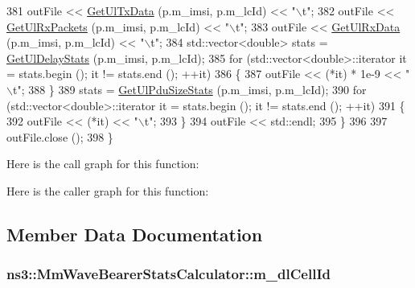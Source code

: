 \begin{DoxyCode}
381       outFile << \hyperlink{classns3_1_1MmWaveBearerStatsCalculator_ab78a9bb574055dfb4fab4218baebc792}{GetUlTxData} (p.m\_imsi, p.m\_lcId) << \textcolor{stringliteral}{"\(\backslash\)t"};
382       outFile << \hyperlink{classns3_1_1MmWaveBearerStatsCalculator_ac892abcdd54ff9f84c722aaf6524fc38}{GetUlRxPackets} (p.m\_imsi, p.m\_lcId) << \textcolor{stringliteral}{"\(\backslash\)t"};
383       outFile << \hyperlink{classns3_1_1MmWaveBearerStatsCalculator_a7aacbef917cf041535e3f794045cb42e}{GetUlRxData} (p.m\_imsi, p.m\_lcId) << \textcolor{stringliteral}{"\(\backslash\)t"};
384       std::vector<double> stats = \hyperlink{classns3_1_1MmWaveBearerStatsCalculator_aba42a6ac5c551058eea70a872fe6ebc9}{GetUlDelayStats} (p.m\_imsi, p.m\_lcId);
385       \textcolor{keywordflow}{for} (std::vector<double>::iterator it = stats.begin (); it != stats.end (); ++it)
386         \{
387           outFile << (*it) * 1e-9 << \textcolor{stringliteral}{"\(\backslash\)t"};
388         \}
389       stats = \hyperlink{classns3_1_1MmWaveBearerStatsCalculator_ab5899e35edd3e8e8e7384002eb95265a}{GetUlPduSizeStats} (p.m\_imsi, p.m\_lcId);
390       \textcolor{keywordflow}{for} (std::vector<double>::iterator it = stats.begin (); it != stats.end (); ++it)
391         \{
392           outFile << (*it) << \textcolor{stringliteral}{"\(\backslash\)t"};
393         \}
394       outFile << std::endl;
395     \}
396 
397   outFile.close ();
398 \}
\end{DoxyCode}


Here is the call graph for this function\+:




Here is the caller graph for this function\+:




\subsection{Member Data Documentation}
\subsubsection[{\texorpdfstring{m\+\_\+dl\+Cell\+Id}{m_dlCellId}}]{ ns3\+::\+Mm\+Wave\+Bearer\+Stats\+Calculator\+::m\+\_\+dl\+Cell\+Id\hspace{0.3cm}{\ttfamily [private]}}\hypertarget{classns3_1_1MmWaveBearerStatsCalculator_a2b8615e2f82d4c8be42854496b5279d5}{}\label{classns3_1_1MmWaveBearerStatsCalculator_a2b8615e2f82d4c8be42854496b5279d5}


